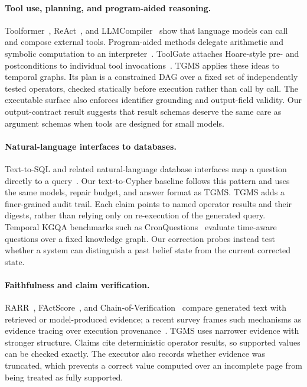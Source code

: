 \documentclass[11pt]{article}
\begin{document}
\paragraph{Tool use, planning, and program-aided reasoning.}
Toolformer~\cite{schick2023toolformer}, ReAct~\cite{yao2023react}, and
LLMCompiler~\cite{kim2024llmcompiler} show that language models can call
and compose external tools. Program-aided methods delegate arithmetic
and symbolic computation to an interpreter~\cite{gao2023pal,chen2023pot}.
ToolGate attaches Hoare-style pre- and postconditions to individual tool
invocations~\cite{liu2026toolgate}. TGMS applies these ideas to temporal
graphs. Its plan is a constrained DAG over a fixed set of independently
tested operators, checked statically before execution rather than call
by call. The executable surface also enforces identifier grounding and
output-field validity.
Our output-contract result suggests that result schemas deserve the same
care as argument schemas when tools are designed for small models.

\paragraph{Natural-language interfaces to databases.}
Text-to-SQL and related natural-language database interfaces map a
question directly to a query~\cite{yu2018spider}. Our text-to-Cypher
baseline follows this pattern and uses the same models, repair budget,
and answer format as TGMS. TGMS adds a finer-grained audit trail. Each
claim points to named operator results and their digests, rather than
relying only on re-execution of the generated query. Temporal KGQA
benchmarks such as CronQuestions~\cite{saxena2021cron} evaluate
time-aware questions over a fixed knowledge graph. Our correction probes
instead test whether a system can distinguish a past belief state from
the current corrected state.

\paragraph{Faithfulness and claim verification.}
RARR~\cite{gao2023rarr}, FActScore~\cite{min2023factscore}, and
Chain-of-Verification~\cite{dhuliawala2023cove} compare generated text
with retrieved or model-produced evidence; a recent survey frames such
mechanisms as evidence tracing over execution
provenance~\cite{wang2026traces}. TGMS uses narrower evidence with
stronger structure. Claims cite deterministic operator results, so
supported values can be checked exactly. The executor also records
whether evidence was truncated, which prevents a correct value computed
over an incomplete page from being treated as fully supported.
\end{document}
